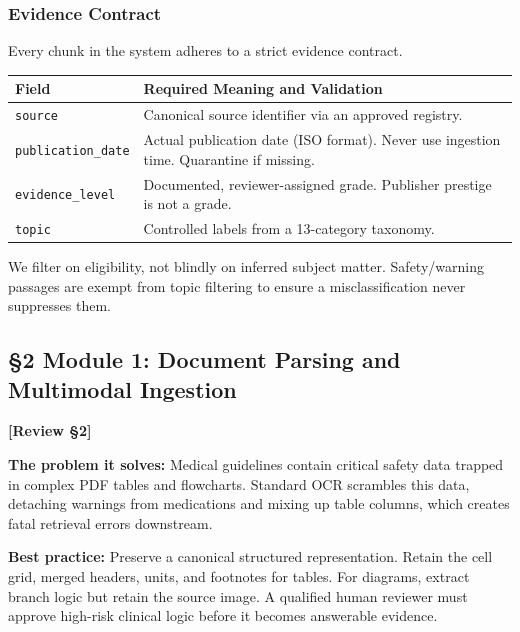 \documentclass[11pt,a4paper]{article}
\newcommand{\origintag}[2]{\textcolor{#1}{\small\textbf{[#2]}}}
\begin{document}
\subsubsection{Evidence Contract}
Every chunk in the system adheres to a strict evidence contract.

\begin{table}[ht]
\centering
\begin{tabularx}{\textwidth}{lX}
\toprule
\textbf{Field} & \textbf{Required Meaning and Validation} \\
\midrule
\texttt{source} & Canonical source identifier via an approved registry. \\
\texttt{publication\_date} & Actual publication date (ISO format). Never use ingestion time. Quarantine if missing. \\
\texttt{evidence\_level} & Documented, reviewer-assigned grade. Publisher prestige is not a grade. \\
\texttt{topic} & Controlled labels from a 13-category taxonomy. \\
\bottomrule
\end{tabularx}
\end{table}

We filter on eligibility, not blindly on inferred subject matter. Safety/warning passages are exempt from topic filtering to ensure a misclassification never suppresses them.
\subsection{\S2 Module 1: Document Parsing and Multimodal Ingestion}
\origintag{amber}{Review \S2}

\textbf{The problem it solves:} Medical guidelines contain critical safety data trapped in complex PDF tables and flowcharts. Standard OCR scrambles this data, detaching warnings from medications and mixing up table columns, which creates fatal retrieval errors downstream.

\textbf{Best practice:} Preserve a canonical structured representation. Retain the cell grid, merged headers, units, and footnotes for tables. For diagrams, extract branch logic but retain the source image. A qualified human reviewer must approve high-risk clinical logic before it becomes answerable evidence.
\end{document}

